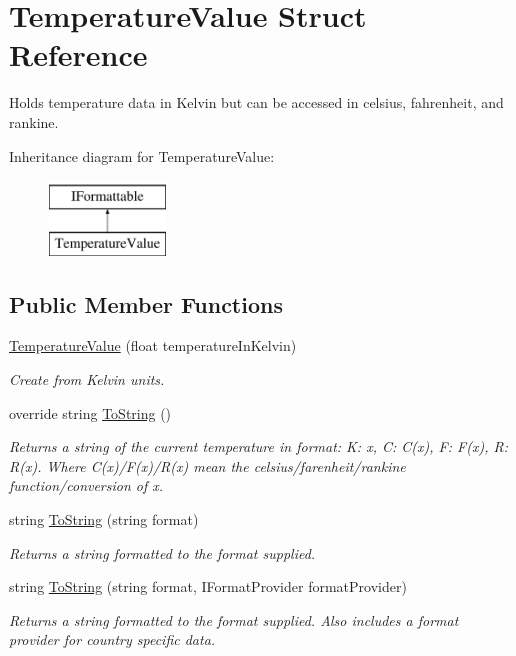 \hypertarget{struct_temperature_value}{}\section{Temperature\+Value Struct Reference}
\label{struct_temperature_value}


Holds temperature data in Kelvin but can be accessed in celsius, fahrenheit, and rankine.  


Inheritance diagram for Temperature\+Value\+:\begin{figure}[H]
\begin{center}
\leavevmode
\includegraphics[height=2.000000cm]{struct_temperature_value}
\end{center}
\end{figure}
\subsection*{Public Member Functions}
\begin{DoxyCompactItemize}
\item 
\hyperlink{struct_temperature_value_a0c5d1613d2629789708449388230df00}{Temperature\+Value} (float temperature\+In\+Kelvin)
\begin{DoxyCompactList}\small\item\em Create from Kelvin units. \end{DoxyCompactList}\item 
override string \hyperlink{struct_temperature_value_afd6eeef5d9c43b759e6a6439ddc855aa}{To\+String} ()
\begin{DoxyCompactList}\small\item\em Returns a string of the current temperature in format\+: K\+: x, C\+: C(x), F\+: F(x), R\+: R(x). Where C(x)/F(x)/R(x) mean the celsius/farenheit/rankine function/conversion of x. \end{DoxyCompactList}\item 
string \hyperlink{struct_temperature_value_a2ef953e39514eea9cc65261393484d68}{To\+String} (string format)
\begin{DoxyCompactList}\small\item\em Returns a string formatted to the format supplied. \end{DoxyCompactList}\item 
string \hyperlink{struct_temperature_value_a69b048929bb1c0623170b623e9b1f052}{To\+String} (string format, I\+Format\+Provider format\+Provider)
\begin{DoxyCompactList}\small\item\em Returns a string formatted to the format supplied. Also includes a format provider for country specific data. \end{DoxyCompactList}\end{DoxyCompactItemize}
